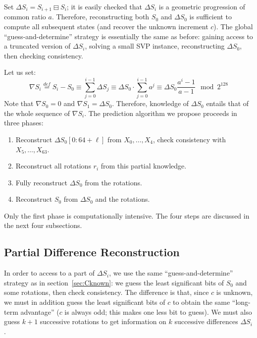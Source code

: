 \documentclass[journal=tosc,final]{iacrtrans}
\begin{document}
Set $\Delta S_i = S_{i+1} \boxminus S_i$; it is easily checked that $\Delta S_i$ is a
geometric progression of common ratio $a$. Therefore, reconstructing both $S_0$
and $\Delta S_0$ is sufficient to compute all subsequent states (and recover the
unknown increment $c$). The global ``guess-and-determine'' strategy is
essentially the same as before: gaining access to a truncated version of
$\Delta S_i$, solving a small SVP instance, reconstructing $\Delta S_0$, then
checking consistency.

Let us set:
\begin{equation}\label{eq:nabla}
  \nabla S_i \stackrel{def}{=} S_i - S_0 \equiv \sum_{j=0}^{i-1} \Delta S_j \equiv \Delta S_0 \cdot \sum_{j=0}^{i-1} a^j \equiv \Delta S_0 \frac{a^i-1}{a-1} \mod 2^{128}
\end{equation}
Note that $\nabla S_0 = 0$ and $\nabla S_1 = \Delta S_0$. Therefore, knowledge
of $\Delta S_0$ entails that of the whole sequence of $\nabla S_i$. The prediction
algorithm we propose proceeds in three phases:
\begin{enumerate}
\item Reconstruct $\Delta S_0[0:64+\ell]$ from $X_0, \dots, X_{4}$, check consistency with $X_5, \dots, X_{63}$.
\item Reconstruct all rotations $r_i$ from this partial knowledge.
\item Fully reconstruct $\Delta S_0$ from the rotations.
\item Reconstruct $S_0$ from $\Delta S_0$ and the rotations.
\end{enumerate}

\noindent Only the first phase is computationally intensive. The four steps are discussed in the next four subsections.

\subsection{Partial Difference Reconstruction}
\label{sec:cvp_small_2}

In order to access to a part of $\Delta S_i$, we use the same
``guess-and-determine'' strategy as in section~\ref{sec:Cknown}: we guess the
least significant bits of $S_0$ and some rotations, then check consistency. The
difference is that, since $c$ is unknown, we must in addition guess the least
significant bits of $c$ to obtain the same ``long-term advantage'' ($c$ is
always odd; this makes one less bit to guess). We must also guess $k+1$
successive rotations to get information on $k$ successive differences
$\Delta S_i$.
\end{document}
